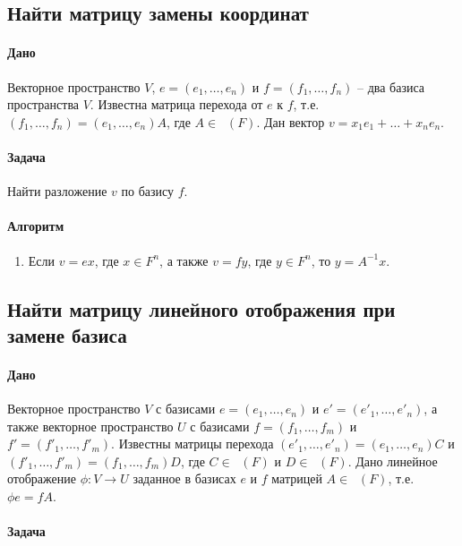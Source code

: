 \documentclass{article}
\newcommand{\MatrixDim}[3]{\mathop{\mathrm{M}_{#2\,#3}}(#1)}
\newcommand{\Matrix}[2]{\mathop{\mathrm{M}_{#2}}(#1)}
\begin{document}
\subsection{Найти матрицу замены координат}

\paragraph{Дано} Векторное пространство $V$, $e=(e_1,\ldots,e_n)$ и $f = (f_1,\ldots,f_n)$ -- два базиса пространства $V$. Известна матрица перехода от $e$ к $f$, т.е. $(f_1,\ldots,f_n) = (e_1,\ldots,e_n)A$, где $A\in \Matrix{F}{n}$. Дан вектор $v = x_1e_1+\ldots+x_n e_n$.

\paragraph{Задача} Найти разложение $v$ по  базису $f$.

\paragraph{Алгоритм}
\begin{enumerate}
\item Если $v = e x$, где $x\in F^{n}$, а также $v = f y$, где $y\in F^{n}$, то $y = A^{-1}x$.
\end{enumerate}


\subsection{Найти матрицу линейного отображения при замене базиса}

\paragraph{Дано}

Векторное пространство $V$ с базисами $e=(e_1,\ldots,e_n)$ и $e'=(e'_1,\ldots,e'_n)$, а также векторное пространство $U$ с базисами $f = (f_1,\ldots,f_m)$ и $f' = (f'_1,\ldots,f'_m)$. Известны матрицы перехода $(e'_1,\ldots,e'_n) = (e_1,\ldots,e_n)C$ и $(f'_1,\ldots,f'_m) = (f_1,\ldots,f_m)D$, где $C\in \Matrix{F}{n}$ и $D\in \Matrix{F}{m}$. Дано линейное отображение $\phi\colon V\to U$ заданное в базисах $e$ и $f$ матрицей $A\in\MatrixDim{F}{n}{m}$, т.е. $\phi e = f A$.

\paragraph{Задача}
\end{document}
